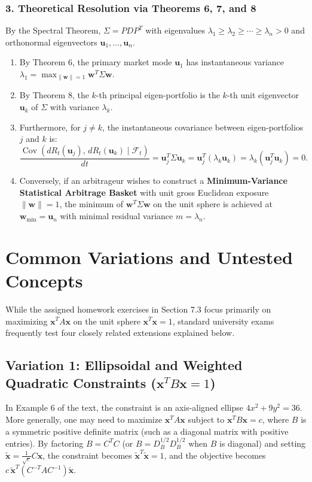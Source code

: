 \documentclass[11pt, letterpaper]{article}
\theoremstyle{definition}
\theoremstyle{remark}
\newcommand{\F}{\mathcal{F}}
\begin{document}
\subsubsection*{3. Theoretical Resolution via Theorems 6, 7, and 8}
By the Spectral Theorem, $\Sigma = P D P^T$ with eigenvalues $\lambda_1 \ge \lambda_2 \ge \cdots \ge \lambda_n > 0$ and orthonormal eigenvectors $\mathbf{u}_1, \dots, \mathbf{u}_n$.
\begin{enumerate}[label=(\roman*)]
    \item By Theorem 6, the primary market mode $\mathbf{u}_1$ has instantaneous variance $\lambda_1 = \max_{\|\mathbf{w}\|=1} \mathbf{w}^T \Sigma \mathbf{w}$.
    \item By Theorem 8, the $k$-th principal eigen-portfolio is the $k$-th unit eigenvector $\mathbf{u}_k$ of $\Sigma$ with variance $\lambda_k$.
    \item Furthermore, for $j \ne k$, the instantaneous covariance between eigen-portfolios $j$ and $k$ is:
    \[
    \frac{\operatorname{Cov}(dR_t(\mathbf{u}_j),\, dR_t(\mathbf{u}_k) \mid \F_t)}{dt} = \mathbf{u}_j^T \Sigma \mathbf{u}_k = \mathbf{u}_j^T (\lambda_k \mathbf{u}_k) = \lambda_k (\mathbf{u}_j^T \mathbf{u}_k) = 0.
    \]
    \item Conversely, if an arbitrageur wishes to construct a \textbf{Minimum-Variance Statistical Arbitrage Basket} with unit gross Euclidean exposure $\|\mathbf{w}\| = 1$, the minimum of $\mathbf{w}^T \Sigma \mathbf{w}$ on the unit sphere is achieved at $\mathbf{w}_{\min} = \mathbf{u}_n$ with minimal residual variance $m = \lambda_n$.
\end{enumerate}

\newpage
\section{Common Variations and Untested Concepts}

While the assigned homework exercises in Section 7.3 focus primarily on maximizing $\mathbf{x}^T A \mathbf{x}$ on the unit sphere $\mathbf{x}^T\mathbf{x} = 1$, standard university exams frequently test four closely related extensions explained below.

\subsection{Variation 1: Ellipsoidal and Weighted Quadratic Constraints ($\mathbf{x}^T B \mathbf{x} = 1$)}
In Example 6 of the text, the constraint is an axis-aligned ellipse $4x^2 + 9y^2 = 36$. More generally, one may need to maximize $\mathbf{x}^T A \mathbf{x}$ subject to $\mathbf{x}^T B \mathbf{x} = c$, where $B$ is a symmetric positive definite matrix (such as a diagonal matrix with positive entries). By factoring $B = C^T C$ (or $B = D_B^{1/2} D_B^{1/2}$ when $B$ is diagonal) and setting $\tilde{\mathbf{x}} = \frac{1}{\sqrt{c}} C\mathbf{x}$, the constraint becomes $\tilde{\mathbf{x}}^T \tilde{\mathbf{x}} = 1$, and the objective becomes $c\,\tilde{\mathbf{x}}^T (C^{-T} A C^{-1})\tilde{\mathbf{x}}$.
\end{document}
